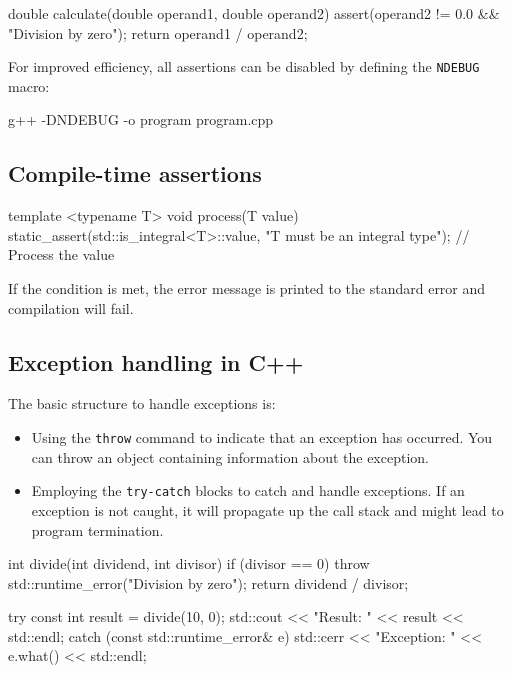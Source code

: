 \begin{exampleblock}
    \begin{codeblock}[language=C++]
double calculate(double operand1, double operand2) {
    assert(operand2 != 0.0 && "Division by zero");
    return operand1 / operand2;
}
    \end{codeblock}
\end{exampleblock}

For improved efficiency, all assertions can be disabled by defining the \texttt{NDEBUG} macro:
\begin{codeblock}[language=bash]
    g++ -DNDEBUG -o program program.cpp
\end{codeblock}


\subsection{Compile-time assertions}

\begin{exampleblock}
    \begin{codeblock}[language=C++]
template <typename T>
void process(T value) {
    static_assert(std::is_integral<T>::value, "T must be an integral type");
    // Process the value
}
    \end{codeblock}
\end{exampleblock}
If the condition is met, the error message is printed to the standard error and compilation will fail.


\subsection{Exception handling in C++}

The basic structure to handle exceptions is:
\begin{itemize}
    \item Using the \texttt{throw} command to indicate that an exception has occurred. You can throw an
    object containing information about the exception.
    \item Employing the \texttt{try-catch} blocks to catch and handle exceptions. If an exception is not
    caught, it will propagate up the call stack and might lead to program termination.
\end{itemize}

\begin{exampleblock}
    \begin{codeblock}[language=C++]
int divide(int dividend, int divisor) {
    if (divisor == 0) {
        throw std::runtime_error("Division by zero");
    }
    return dividend / divisor;
}

try{
    const int result = divide(10, 0);
    std::cout << "Result: " << result << std::endl;
} catch (const std::runtime_error& e) {
    std::cerr << "Exception: " << e.what() << std::endl;
}
    \end{codeblock}
\end{exampleblock}

